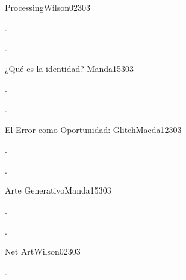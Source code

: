 \begin{syllabus}
\begin{unit}{Processing}{}{Wilson02}{30}{3}
   \begin{topics}
      \item . 
   \end{topics}

   \begin{learningoutcomes}
      \item .
   \end{learningoutcomes}
\end{unit}

\begin{unit}{¿Qué es la identidad? }{}{Manda15}{30}{3}
   \begin{topics}
      \item . 
   \end{topics}

   \begin{learningoutcomes}
      \item . 
   \end{learningoutcomes}
\end{unit}

\begin{unit}{El Error como Oportunidad: Glitch}{}{Maeda12}{30}{3}
   \begin{topics}
      \item .
   \end{topics}

   \begin{learningoutcomes}
      \item . 
   \end{learningoutcomes}
\end{unit}

\begin{unit}{Arte Generativo}{}{Manda15}{30}{3}
   \begin{topics}
      \item . 
   \end{topics}

   \begin{learningoutcomes}
      \item . 
   \end{learningoutcomes}
\end{unit}

\begin{unit}{Net Art}{}{Wilson02}{30}{3}
   \begin{topics}
      \item .
   \end{topics}


\end{unit}
\end{syllabus}
